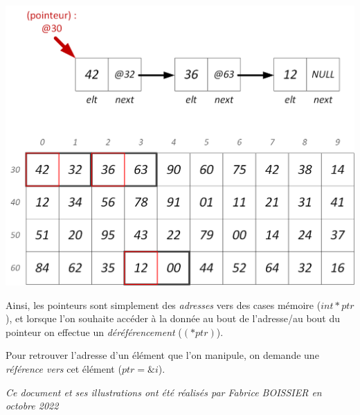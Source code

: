 \documentclass[11pt,a4paper]{article}
\begin{document}
\begin{center}
\includegraphics[scale=0.85]{img/pointeurs/pointeurs2.png}
\end{center}

Ainsi, les pointeurs sont simplement des \textit{adresses} vers des cases mémoire ($ int *ptr $), et lorsque l'on souhaite accéder à la donnée au bout de l'adresse/au bout du pointeur on effectue un \textit{déréférencement} ($ (*ptr) $).

Pour retrouver l'adresse d'un élément que l'on manipule, on demande une \textit{référence vers} cet élément ($ ptr = \&i $).


\bigskip

\vfillFirst

\vfillLast


\begin{center}
\textit{Ce document et ses illustrations ont été réalisés par Fabrice BOISSIER en octobre 2022}
\end{center}
\end{document}
